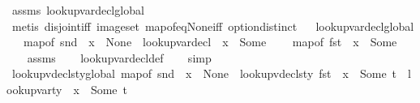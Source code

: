 \begin{isabellebody}
\ assms\ lookup{\isacharunderscore}{\kern0pt}var{\isacharunderscore}{\kern0pt}decl{\isacharunderscore}{\kern0pt}global\ \isanewline
\ \ \isamarkupfalse%
\ {\isacharparenleft}{\kern0pt}metis\ disjoint{\isacharunderscore}{\kern0pt}iff\ image{\isacharunderscore}{\kern0pt}set\ map{\isacharunderscore}{\kern0pt}of{\isacharunderscore}{\kern0pt}eq{\isacharunderscore}{\kern0pt}None{\isacharunderscore}{\kern0pt}iff\ option{\isachardot}{\kern0pt}distinct{\isacharparenleft}{\kern0pt}{}{\isacharparenright}{\kern0pt}{\isacharparenright}{\kern0pt}%
\endisatagproof
{\isafoldproof}%
%
\isadelimproof
\isanewline
%
\endisadelimproof
\ \isanewline
{}\isamarkupfalse%
\ lookup{\isacharunderscore}{\kern0pt}var{\isacharunderscore}{\kern0pt}decl{\isacharunderscore}{\kern0pt}global{\isacharunderscore}{\kern0pt}{}{\isacharcolon}{\kern0pt}\isanewline
\ \ \ {\isachardoublequoteopen}map{\isacharunderscore}{\kern0pt}of\ {\isacharparenleft}{\kern0pt}snd\ {\isasymLambda}{\isacharparenright}{\kern0pt}\ x\ {\isacharequal}{\kern0pt}\ None{\isachardoublequoteclose}\ \ {\isachardoublequoteopen}lookup{\isacharunderscore}{\kern0pt}var{\isacharunderscore}{\kern0pt}decl\ {\isasymLambda}\ x\ {\isacharequal}{\kern0pt}\ Some\ {\isasymtau}{\isachardoublequoteclose}\isanewline
\ \ \ {\isachardoublequoteopen}map{\isacharunderscore}{\kern0pt}of\ {\isacharparenleft}{\kern0pt}fst\ {\isasymLambda}{\isacharparenright}{\kern0pt}\ x\ {\isacharequal}{\kern0pt}\ Some\ {\isasymtau}{\isachardoublequoteclose}\isanewline
%
\isadelimproof
\ \ %
\endisadelimproof
%
\isatagproof
{}\isamarkupfalse%
\ assms\isanewline
\ \ \isamarkupfalse%
\ lookup{\isacharunderscore}{\kern0pt}var{\isacharunderscore}{\kern0pt}decl{\isacharunderscore}{\kern0pt}def\isanewline
\ \ \isamarkupfalse%
\ simp%
\endisatagproof
{\isafoldproof}%
%
\isadelimproof
\isanewline
%
\endisadelimproof
\isanewline
{}\isamarkupfalse%
\ lookup{\isacharunderscore}{\kern0pt}vdecls{\isacharunderscore}{\kern0pt}ty{\isacharunderscore}{\kern0pt}global{\isacharunderscore}{\kern0pt}{}{\isacharcolon}{\kern0pt}\ {\isachardoublequoteopen}map{\isacharunderscore}{\kern0pt}of\ {\isacharparenleft}{\kern0pt}snd\ {\isasymLambda}{\isacharparenright}{\kern0pt}\ x\ {\isacharequal}{\kern0pt}\ None\ {\isasymLongrightarrow}\ lookup{\isacharunderscore}{\kern0pt}vdecls{\isacharunderscore}{\kern0pt}ty\ {\isacharparenleft}{\kern0pt}fst\ {\isasymLambda}{\isacharparenright}{\kern0pt}\ x\ {\isacharequal}{\kern0pt}\ Some\ t\ {\isasymLongrightarrow}\ lookup{\isacharunderscore}{\kern0pt}var{\isacharunderscore}{\kern0pt}ty\ {\isasymLambda}\ x\ {\isacharequal}{\kern0pt}\ Some\ t{\isachardoublequoteclose}\isanewline

\end{isabellebody}
